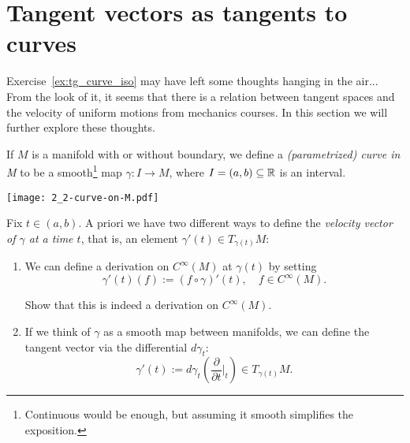 \section{Tangent vectors as tangents to curves}

Exercise~\ref{ex:tg_curve_iso} may have left some thoughts hanging in the air...
From the look of it, it seems that there is a relation between tangent spaces and the velocity of uniform motions from mechanics courses.
In this section we will further explore these thoughts.

\begin{definition}
  If $M$ is a manifold with or without boundary, we define a \emph{(parametrized) curve in M} to be a smooth\footnote{Continuous would be enough, but assuming it smooth simplifies the exposition.} map $\gamma : I \to M$, where $I=(a,b)\subseteq\mathbb{R}$ is an interval.
\end{definition}
\begin{marginfigure}
  \texttt{[image: 2\_2-curve-on-M.pdf]}
\end{marginfigure}

Fix $t\in(a,b)$. 
A priori we have two different ways to define the \emph{velocity vector of $\gamma$ at a time $t$}, that is, an element $\gamma'(t) \in T_{\gamma(t)}M$:
\begin{enumerate}
  \item We can define a derivation on $C^\infty(M)$ at $\gamma(t)$ by setting
  \begin{equation}\label{eq:tg_curve_der}
    \gamma'(t) (f) := (f\circ\gamma)'(t), \quad f\in C^\infty(M).
  \end{equation}
  \begin{exercise}
    Show that this is indeed a derivation on $C^\infty(M)$.
  \end{exercise}
  \item If we think of $\gamma$ as a smooth map between manifolds, we can define the tangent vector via the differential $d\gamma_t$:
  \begin{equation}\label{eq:tg_curve_diff}
    \gamma'(t):= d\gamma_t\left(\frac{\partial}{\partial t}\Big|_t\right) \in T_{\gamma(t)}M.
  \end{equation}
\end{enumerate}

